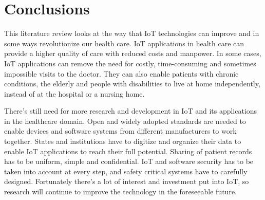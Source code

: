 \section{Conclusions}
\label{sec:conclusion}

This literature review looks at the way that IoT technologies can improve and
in some ways revolutionize our health care. IoT applications in health care can
provide a higher quality of care with reduced costs and manpower. In some
cases, IoT applications can remove the need for costly, time-consuming and
sometimes impossible visits to the doctor. They can also enable patients with
chronic conditions, the elderly and people with disabilities to live at home
independently, instead of at the hospital or a nursing home. 

There's still need for more research and development in IoT and its
applications in the healthcare domain. Open and widely adopted standards are
needed to enable devices and software systems from different manufacturers to
work together. States and institutions have to digitize and organize their data
to enable IoT applications to reach their full potential. Sharing of patient
records has to be uniform, simple and confidential. IoT and software security
has to be taken into account at every step, and safety critical systems have to
carefully designed. Fortunately there's a lot of interest and investment put
into IoT, so research will continue to improve the technology in the
foreseeable future.
